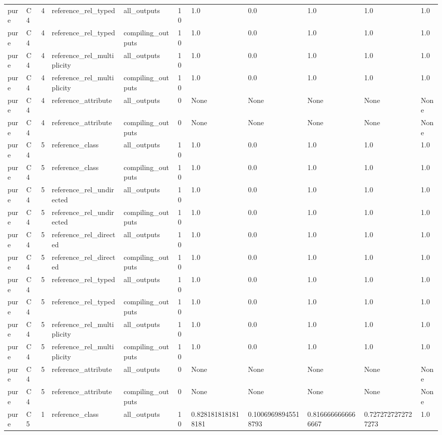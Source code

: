 \begin{tabular}{lllllllllll}
pure & C4 & 4 & reference\_rel\_typed & all\_outputs & 10 & 1.0 & 0.0 & 1.0 & 1.0 & 1.0 \\
pure & C4 & 4 & reference\_rel\_typed & compiling\_outputs & 10 & 1.0 & 0.0 & 1.0 & 1.0 & 1.0 \\
pure & C4 & 4 & reference\_rel\_multiplicity & all\_outputs & 10 & 1.0 & 0.0 & 1.0 & 1.0 & 1.0 \\
pure & C4 & 4 & reference\_rel\_multiplicity & compiling\_outputs & 10 & 1.0 & 0.0 & 1.0 & 1.0 & 1.0 \\
pure & C4 & 4 & reference\_attribute & all\_outputs & 0 & None & None & None & None & None \\
pure & C4 & 4 & reference\_attribute & compiling\_outputs & 0 & None & None & None & None & None \\
pure & C4 & 5 & reference\_class & all\_outputs & 10 & 1.0 & 0.0 & 1.0 & 1.0 & 1.0 \\
pure & C4 & 5 & reference\_class & compiling\_outputs & 10 & 1.0 & 0.0 & 1.0 & 1.0 & 1.0 \\
pure & C4 & 5 & reference\_rel\_undirected & all\_outputs & 10 & 1.0 & 0.0 & 1.0 & 1.0 & 1.0 \\
pure & C4 & 5 & reference\_rel\_undirected & compiling\_outputs & 10 & 1.0 & 0.0 & 1.0 & 1.0 & 1.0 \\
pure & C4 & 5 & reference\_rel\_directed & all\_outputs & 10 & 1.0 & 0.0 & 1.0 & 1.0 & 1.0 \\
pure & C4 & 5 & reference\_rel\_directed & compiling\_outputs & 10 & 1.0 & 0.0 & 1.0 & 1.0 & 1.0 \\
pure & C4 & 5 & reference\_rel\_typed & all\_outputs & 10 & 1.0 & 0.0 & 1.0 & 1.0 & 1.0 \\
pure & C4 & 5 & reference\_rel\_typed & compiling\_outputs & 10 & 1.0 & 0.0 & 1.0 & 1.0 & 1.0 \\
pure & C4 & 5 & reference\_rel\_multiplicity & all\_outputs & 10 & 1.0 & 0.0 & 1.0 & 1.0 & 1.0 \\
pure & C4 & 5 & reference\_rel\_multiplicity & compiling\_outputs & 10 & 1.0 & 0.0 & 1.0 & 1.0 & 1.0 \\
pure & C4 & 5 & reference\_attribute & all\_outputs & 0 & None & None & None & None & None \\
pure & C4 & 5 & reference\_attribute & compiling\_outputs & 0 & None & None & None & None & None \\
pure & C5 & 1 & reference\_class & all\_outputs & 10 & 0.8281818181818181 & 0.10069698945518793 & 0.8166666666666667 & 0.7272727272727273 & 1.0 \\

\end{tabular}
